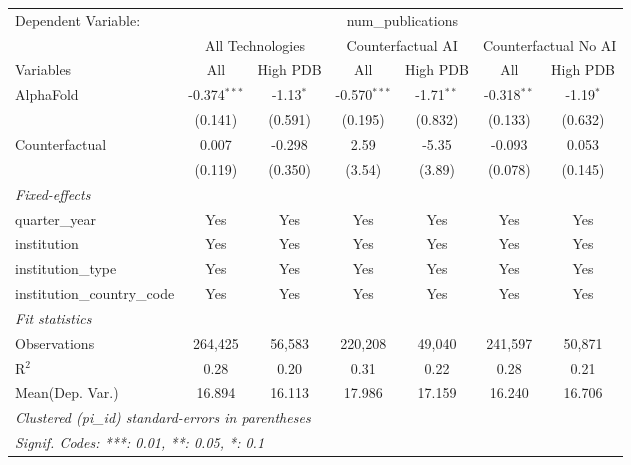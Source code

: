 \begingroup
\centering
\begin{tabular}{lcccccc}
   \tabularnewline \midrule \midrule
   Dependent Variable: & \multicolumn{6}{c}{num\_publications}\\
 & \multicolumn{2}{c}{All Technologies} & \multicolumn{2}{c}{Counterfactual AI} & \multicolumn{2}{c}{Counterfactual No AI} \\
\cmidrule(lr){1-1}\cmidrule(lr){2-3} \cmidrule(lr){4-5} \cmidrule(lr){6-7}
Variables & \multicolumn{1}{c}{All} & \multicolumn{1}{c}{High PDB} & \multicolumn{1}{c}{All} & \multicolumn{1}{c}{High PDB} & \multicolumn{1}{c}{All} & \multicolumn{1}{c}{High PDB} \\
\cmidrule(lr){1-1}\cmidrule(lr){2-2} \cmidrule(lr){3-3} \cmidrule(lr){4-4} \cmidrule(lr){5-5} \cmidrule(lr){6-6} \cmidrule(lr){7-7}
   AlphaFold                    & -0.374$^{***}$ & -1.13$^{*}$ & -0.570$^{***}$ & -1.71$^{**}$ & -0.318$^{**}$ & -1.19$^{*}$\\   
                                & (0.141)        & (0.591)     & (0.195)        & (0.832)      & (0.133)       & (0.632)\\   
   Counterfactual               & 0.007          & -0.298      & 2.59           & -5.35        & -0.093        & 0.053\\   
                                & (0.119)        & (0.350)     & (3.54)         & (3.89)       & (0.078)       & (0.145)\\   
   \midrule
   \emph{Fixed-effects}\\
   quarter\_year                & Yes            & Yes         & Yes            & Yes          & Yes           & Yes\\  
   institution                  & Yes            & Yes         & Yes            & Yes          & Yes           & Yes\\  
   institution\_type            & Yes            & Yes         & Yes            & Yes          & Yes           & Yes\\  
   institution\_country\_code   & Yes            & Yes         & Yes            & Yes          & Yes           & Yes\\  
   \midrule
   \emph{Fit statistics}\\
   Observations                 & 264,425        & 56,583      & 220,208        & 49,040       & 241,597       & 50,871\\  
   R$^2$                        & 0.28           & 0.20        & 0.31           & 0.22         & 0.28          & 0.21\\  
Mean(Dep. Var.) & 16.894 & 16.113 & 17.986 & 17.159 & 16.240 & 16.706 \\
   \midrule \midrule
   \multicolumn{7}{l}{\emph{Clustered (pi\_id) standard-errors in parentheses}}\\
   \multicolumn{7}{l}{\emph{Signif. Codes: ***: 0.01, **: 0.05, *: 0.1}}\\
\end{tabular}
\par\endgroup
